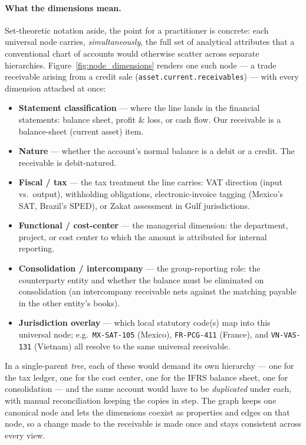 \paragraph{What the dimensions mean.} Set-theoretic notation aside, the point for a practitioner is concrete: each universal node carries, \emph{simultaneously}, the full set of analytical attributes that a conventional chart of accounts would otherwise scatter across separate hierarchies. Figure~\ref{fig:node_dimensions} renders one such node --- a trade receivable arising from a credit sale (\texttt{asset.current.receivables}) --- with every dimension attached at once:
\begin{itemize}
    \item \textbf{Statement classification} --- where the line lands in the financial statements: balance sheet, profit \& loss, or cash flow. Our receivable is a balance-sheet (current asset) item.
    \item \textbf{Nature} --- whether the account's normal balance is a debit or a credit. The receivable is debit-natured.
    \item \textbf{Fiscal / tax} --- the tax treatment the line carries: VAT direction (input vs.\ output), withholding obligations, electronic-invoice tagging (Mexico's SAT, Brazil's SPED), or Zakat assessment in Gulf jurisdictions.
    \item \textbf{Functional / cost-center} --- the managerial dimension: the department, project, or cost center to which the amount is attributed for internal reporting.
    \item \textbf{Consolidation / intercompany} --- the group-reporting role: the counterparty entity and whether the balance must be eliminated on consolidation (an intercompany receivable nets against the matching payable in the other entity's books).
    \item \textbf{Jurisdiction overlay} --- which local statutory code(s) map into this universal node; e.g.\ \texttt{MX-SAT-105} (Mexico), \texttt{FR-PCG-411} (France), and \texttt{VN-VAS-131} (Vietnam) all resolve to the same universal receivable.
\end{itemize}
In a single-parent \emph{tree}, each of these would demand its own hierarchy --- one for the tax ledger, one for the cost center, one for the IFRS balance sheet, one for consolidation --- and the same account would have to be \emph{duplicated} under each, with manual reconciliation keeping the copies in step. The graph keeps one canonical node and lets the dimensions coexist as properties and edges on that node, so a change made to the receivable is made once and stays consistent across every view.

